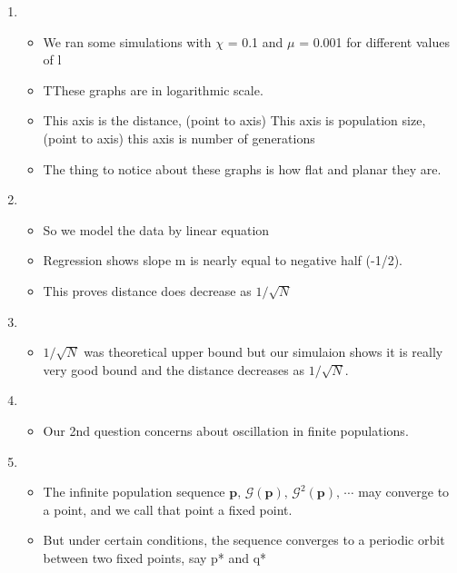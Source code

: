 \documentclass{article}
\begin{document}
\begin{enumerate}
\item
  \begin{itemize}
  \item We ran some simulations with $\chi$ = 0.1 and $\mu$ = 0.001 for
    different values of l
  \item TThese graphs are in logarithmic scale.
  \item  This axis is the distance, (point to axis) This axis is population size, (point to axis) this axis is number of generations
  \item The thing to notice about these graphs is how flat and planar they are. 
  \end{itemize}
    
\item
  \begin{itemize}
  \item So we model the data by linear equation
  \item Regression shows slope m is nearly equal to negative half (-1/2).
  \item This proves distance does decrease as $1/\sqrt{N}$  
  \end{itemize}

\item
  \begin{itemize}
  \item $1/\sqrt{N}$ was theoretical upper bound 
  but our simulaion shows it is really very good bound 
  and the distance decreases as $1/\sqrt{N}$. 
  \end{itemize}
    
\item 
  \begin{itemize}
  \item Our 2nd question concerns about oscillation in
    finite populations.
  \end{itemize}
    
\item
  \begin{itemize}
  \item The infinite population sequence  $\bm{p}, \, \mathcal{G}(\bm{p}), \, {\mathcal{G}}^2(\bm{p}), \, \cdots$ may
    converge to a point, and we call that point a fixed point.
  \item But under certain conditions, the sequence converges to a
    periodic orbit between two fixed points, say p* and q*
\end{itemize}


\end{enumerate}
\end{document}

